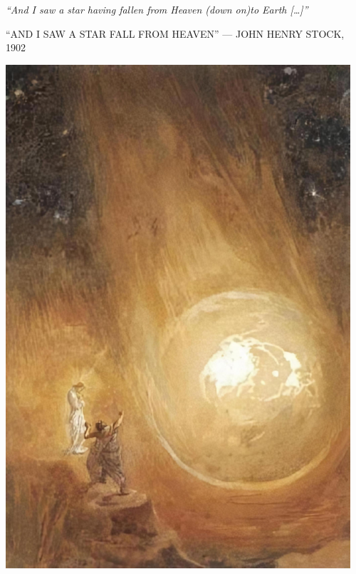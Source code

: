 \clearpage
\thispagestyle{empty}
\null\vfill
\settowidth{}
\begin{center}
\parbox{\longest}{%
  \raggedright{\huge\itshape%
    ``And I saw a star having fallen from Heaven (down on)to Earth […]'' \par\bigskip
  }
  \raggedleft\Large\MakeUppercase{``And I saw a Star fall from Heaven'' — John Henry Stock, 1902}\par%
}
\vfill\vfill
\clearpage\newpage
\end{center}
\newpage
\thispagestyle{empty}
\begin{center}
	\includegraphics[width=0.96\textwidth]{images/illustrations/stockfallenstar}
\end{center}